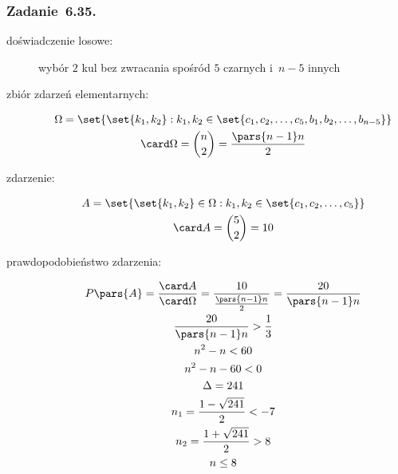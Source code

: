 \subsubsection*{Zadanie~6.35.}
\begin{description}
    \item[doświadczenie losowe:] wybór \(2\) kul bez zwracania spośród \(5\) czarnych i~\(n - 5\) innych
    \item[zbiór zdarzeń elementarnych:]
        \begin{gather*}
            \Omega = \set{\set{k_1, k_2} : k_1, k_2 \in \set{c_1, c_2, \ldots, c_5, b_1, b_2, \ldots, b_{n - 5}}}\\
            \card\Omega = \binom{n}{2} = \frac{\pars{n - 1}n}{2}
        \end{gather*}
    \item[zdarzenie:]
        \begin{gather*}
            A = \set{\set{k_1, k_2} \in \Omega : k_1, k_2 \in \set{c_1, c_2, \ldots, c_5}}\\
            \card A = \binom{5}{2} = 10
        \end{gather*}
    \item[prawdopodobieństwo zdarzenia:]
        \begin{gather*}
            P\pars{A}
                = \frac{\card A}{\card\Omega}
                = \frac{10}{\frac{\pars{n - 1}n}{2}}
                = \frac{20}{\pars{n - 1}n}\\
            \frac{20}{\pars{n - 1}n} > \frac{1}{3}\\
            n^2 - n < 60\\
            n^2 - n - 60 < 0\\
            \Delta = 241\\
            n_1
                = \frac{1 - \sqrt{241}}{2} < -7\\
            n_2
                = \frac{1 + \sqrt{241}}{2} > 8\\
            n \leq 8
        \end{gather*}
\end{description}

